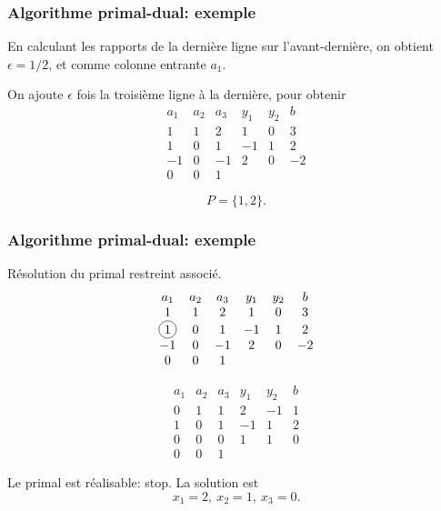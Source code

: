 \documentclass[t,usepdftitle=false]{beamer}
\newcommand*\circled[1]{\tikz[baseline=(char.base)]{
    \node[shape=circle,draw,inner sep=2pt] (char) {#1};}}
\begin{document}
\begin{frame}
\frametitle{Algorithme primal-dual: exemple}

En calculant les rapports de la dernière ligne sur l'avant-dernière, on obtient $\epsilon = 1/2$, et comme colonne entrante $a_1$.

\mbox{}

On ajoute $\epsilon$ fois la troisième ligne à la dernière, pour obtenir
\[
\begin{matrix}
a_1 & a_2 & a_3 & y_1 & y_2 & b \\
1 & 1 & 2 & 1 & 0 & 3 \\
1 & 0 & 1 & -1 & 1 & 2 \\
-1 & 0 & -1 & 2 & 0 & -2 \\
0 & 0 & 1
\end{matrix}
\]

\mbox{}

\[
P = \lbrace 1, 2 \rbrace.
\]

\end{frame}

\begin{frame}
\frametitle{Algorithme primal-dual: exemple}

Résolution du primal restreint associé.
\[
\begin{matrix}
a_1 & a_2 & a_3 & y_1 & y_2 & b \\
1 & 1 & 2 & 1 & 0 & 3 \\
\circled{1} & 0 & 1 & -1 & 1 & 2 \\
-1 & 0 & -1 & 2 & 0 & -2 \\
0 & 0 & 1
\end{matrix}
\]

\mbox{}

\[
\begin{matrix}
a_1 & a_2 & a_3 & y_1 & y_2 & b \\
0 & 1 & 1 & 2 & -1 & 1 \\
1 & 0 & 1 & -1 & 1 & 2 \\
0 & 0 & 0 & 1 & 1 & 0 \\
0 & 0 & 1
\end{matrix}
\]

Le primal est réalisable: stop. La solution est
\[
x_1 = 2,\ x_2 = 1,\ x_3 = 0.
\]

\end{frame}
\end{document}

